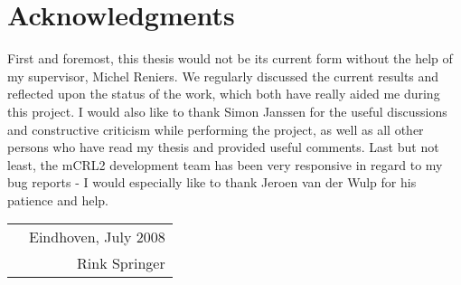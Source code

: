 \section*{Acknowledgments}

First and foremost, this thesis would not be its current form without the help of my supervisor, Michel Reniers. We regularly discussed the current results and reflected upon the status of the work, which both have really aided me during this project. I would also like to thank Simon Janssen for the useful discussions and constructive criticism while performing the project, as well as all other persons who have read my thesis and provided useful comments. Last but not least, the mCRL2 development team has been very responsive in regard to my bug reports - I would especially like to thank Jeroen van der Wulp for his patience and help.

\vspace{5mm}
\begin{tabularx}{\textwidth}{Xr}
 & Eindhoven, July 2008 \\
 & Rink Springer \\
\end{tabularx}
